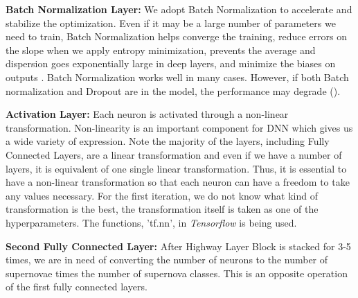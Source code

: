 \documentclass[useamsfonts]{pasj01}
\begin{document}
{\bf Batch Normalization Layer:}
We adopt Batch Normalization \citep{batch_norm} to accelerate and stabilize the optimization.  Even if it may be a large number of parameters we need to train, Batch Normalization helps converge the training, reduce errors on the slope when we apply entropy minimization, prevents the average and dispersion goes exponentially large in deep layers, and minimize the biases on outputs \citep{understanding_batch_norm}.
Batch Normalization works well in many cases. However, if both Batch normalization and Dropout are in the model, the performance may degrade (\cite{dropout_and_batch_norm}).   

{\bf Activation Layer:}
Each neuron is activated through a non-linear transformation.  Non-linearity is an important component for DNN which gives us a wide variety of expression.   Note the majority of the layers, including Fully Connected Layers, are a linear transformation and even if we have a number of layers, it is equivalent of one single linear transformation.   Thus, it is essential to have a non-linear transformation so that each neuron can have a freedom to take any values necessary.
For the first iteration, we do not know what kind of transformation is the best, the transformation itself is taken as one of the hyperparameters.  The functions, 'tf.nn', in {\it Tensorflow} is being used.

{\bf Second Fully Connected Layer:}
After Highway Layer Block is stacked for 3-5 times, we are in need of converting the number of neurons to the number of supernovae times the number of supernova classes.   This is an opposite operation of the first fully connected layers.
\end{document}
